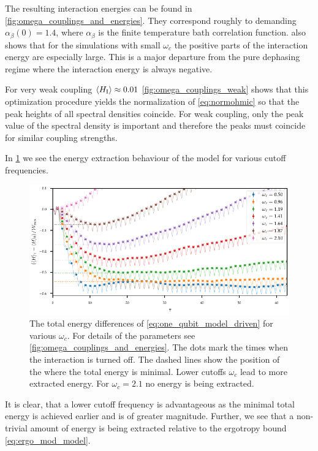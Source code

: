 The resulting interaction energies can be found in
\cref{fig:omega_couplings_and_energies}. They correspond roughly to
demanding \(α_{β}(0)=1.4\), where \(α_{β}\) is the finite temperature
bath correlation function.  
also shows that for the simulations with small \(ω_{c}\) the positive
parts of the interaction energy are especially large. This is a major
departure from the pure dephasing regime where the interaction energy
is always negative.

For very weak coupling \(\ev{H_{\inter}}\approx 0.01\)
\cref{fig:omega_couplings_weak} shows that this optimization procedure
yields the normalization of \cref{eq:normohmic} so that the peak
heights of all spectral densities coincide. For weak coupling, only
the peak value of the spectral density is important and therefore the
peaks must coincide for similar coupling strengths.

In \cref{fig:omegas_total} we see the energy extraction behaviour of
the model for various cutoff frequencies.
\begin{figure}[htp]
  \centering
  \includegraphics{figs/one_bath_mod/omegas_total}
  \caption{\label{fig:omegas_total} The total energy differences of
    \cref{eq:one_qubit_model_driven} for various \(ω_{c}\). For
    details of the parameters see
    \cref{fig:omega_couplings_and_energies}. The dots mark the times
    when the interaction is turned off.  The dashed lines show the
    position of the where the total energy is minimal. Lower cutoffs
    \(ω_{c}\) lead to more extracted energy. For \(ω_{c}=2.1\) no
    energy is being extracted.}
\end{figure}
It is clear, that a lower cutoff frequency is advantageous as the
minimal total energy is achieved earlier and is of greater
magnitude. Further, we see that a non-trivial amount of energy is
being extracted relative to the ergotropy bound
\cref{eq:ergo_mod_model}.

